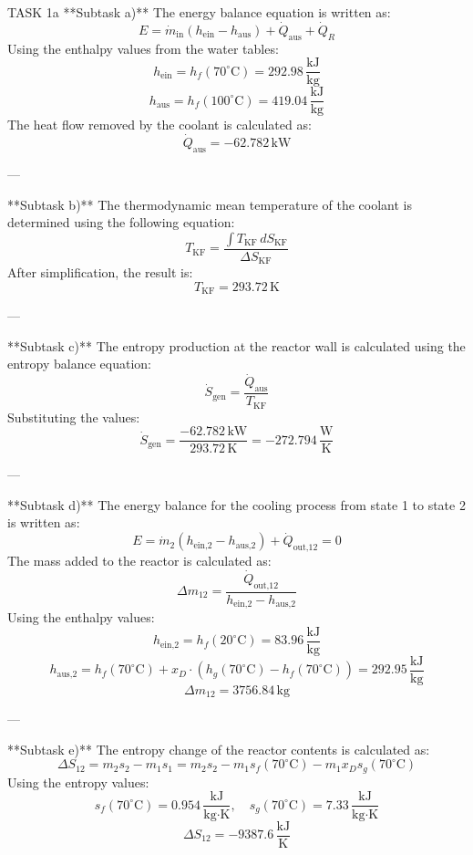 TASK 1a  
**Subtask a)**  
The energy balance equation is written as:  
\[
E = \dot{m}_{\text{in}} (h_{\text{ein}} - h_{\text{aus}}) + \dot{Q}_{\text{aus}} + \dot{Q}_R
\]  
Using the enthalpy values from the water tables:  
\[
h_{\text{ein}} = h_f(70^\circ\text{C}) = 292.98 \, \frac{\text{kJ}}{\text{kg}}
\]  
\[
h_{\text{aus}} = h_f(100^\circ\text{C}) = 419.04 \, \frac{\text{kJ}}{\text{kg}}
\]  
The heat flow removed by the coolant is calculated as:  
\[
\dot{Q}_{\text{aus}} = -62.782 \, \text{kW}
\]  

---

**Subtask b)**  
The thermodynamic mean temperature of the coolant is determined using the following equation:  
\[
T_{\text{KF}} = \frac{\int T_{\text{KF}} \, dS_{\text{KF}}}{\Delta S_{\text{KF}}}
\]  
After simplification, the result is:  
\[
T_{\text{KF}} = 293.72 \, \text{K}
\]  

---

**Subtask c)**  
The entropy production at the reactor wall is calculated using the entropy balance equation:  
\[
\dot{S}_{\text{gen}} = \frac{\dot{Q}_{\text{aus}}}{T_{\text{KF}}}
\]  
Substituting the values:  
\[
\dot{S}_{\text{gen}} = \frac{-62.782 \, \text{kW}}{293.72 \, \text{K}} = -272.794 \, \frac{\text{W}}{\text{K}}
\]  

---

**Subtask d)**  
The energy balance for the cooling process from state 1 to state 2 is written as:  
\[
E = \dot{m}_2 (h_{\text{ein,2}} - h_{\text{aus,2}}) + \dot{Q}_{\text{out,12}} = 0
\]  
The mass added to the reactor is calculated as:  
\[
\Delta m_{12} = \frac{\dot{Q}_{\text{out,12}}}{h_{\text{ein,2}} - h_{\text{aus,2}}}
\]  
Using the enthalpy values:  
\[
h_{\text{ein,2}} = h_f(20^\circ\text{C}) = 83.96 \, \frac{\text{kJ}}{\text{kg}}
\]  
\[
h_{\text{aus,2}} = h_f(70^\circ\text{C}) + x_D \cdot (h_g(70^\circ\text{C}) - h_f(70^\circ\text{C})) = 292.95 \, \frac{\text{kJ}}{\text{kg}}
\]  
\[
\Delta m_{12} = 3756.84 \, \text{kg}
\]  

---

**Subtask e)**  
The entropy change of the reactor contents is calculated as:  
\[
\Delta S_{12} = m_2 s_2 - m_1 s_1 = m_2 s_2 - m_1 s_f(70^\circ\text{C}) - m_1 x_D s_g(70^\circ\text{C})
\]  
Using the entropy values:  
\[
s_f(70^\circ\text{C}) = 0.954 \, \frac{\text{kJ}}{\text{kg·K}}, \quad s_g(70^\circ\text{C}) = 7.33 \, \frac{\text{kJ}}{\text{kg·K}}
\]  
\[
\Delta S_{12} = -9387.6 \, \frac{\text{kJ}}{\text{K}}
\]  